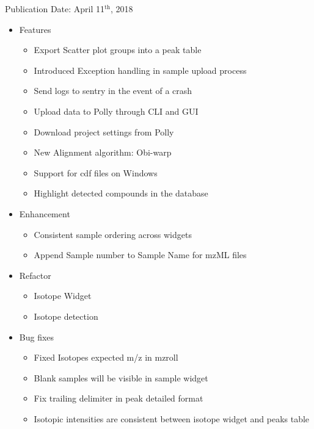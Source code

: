 \documentclass[letterpaper,10pt,english,openany,oneside]{sphinxmanual}
\begin{document}
Publication Date: April 11$^{\text{th}}$, 2018
\begin{itemize}
\item {} 
Features
\begin{itemize}
\item {} 
Export Scatter plot groups into a peak table

\item {} 
Introduced Exception handling in sample upload process

\item {} 
Send logs to sentry in the event of a crash

\item {} 
Upload data to Polly through CLI and GUI

\item {} 
Download project settings from Polly

\item {} 
New Alignment algorithm: Obi-warp

\item {} 
Support for cdf files on Windows

\item {} 
Highlight detected compounds in the database

\end{itemize}

\item {} 
Enhancement
\begin{itemize}
\item {} 
Consistent sample ordering across widgets

\item {} 
Append Sample number to Sample Name for mzML files

\end{itemize}

\item {} 
Refactor
\begin{itemize}
\item {} 
Isotope Widget

\item {} 
Isotope detection

\end{itemize}

\item {} 
Bug fixes
\begin{itemize}
\item {} 
Fixed Isotopes expected m/z in mzroll

\item {} 
Blank samples will be visible in sample widget

\item {} 
Fix trailing delimiter in peak detailed format

\item {} 
Isotopic intensities are consistent between isotope widget and peaks table

\end{itemize}

\end{itemize}
\end{document}
